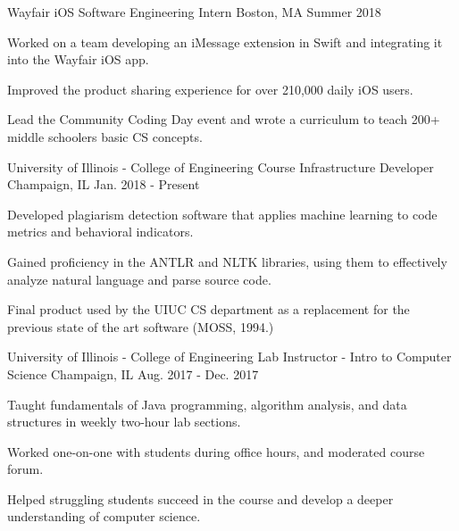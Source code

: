 
\begin{cventries}
\cventry
{Wayfair} %
{iOS Software Engineering Intern} %
{Boston, MA} %
{Summer 2018} %
{
	\begin{cvitems} %
		\item {Worked on a team developing an iMessage extension in Swift and integrating it into the Wayfair iOS app.}
		\item {Improved the product sharing experience for over 210,000 daily iOS users.}
		\item {Lead the Community Coding Day event and wrote a curriculum to teach 200+ middle schoolers basic CS concepts.}
	\end{cvitems}
}
\cventry
{University of Illinois - College of Engineering} %
{Course Infrastructure Developer} %
{Champaign, IL} %
{Jan. 2018 - Present} %
{
    \begin{cvitems} %
        \item {Developed plagiarism detection software that applies machine learning to code metrics and behavioral indicators.}
        \item {Gained proficiency in the ANTLR and NLTK libraries, using them to effectively analyze natural language and parse source code.}
       \item {Final product used by the UIUC CS department as a replacement for the previous state of the art software (MOSS, 1994.)}
    \end{cvitems}
}
\cventry
{University of Illinois - College of Engineering} %
{Lab Instructor - Intro to Computer Science} %
{Champaign, IL} %
{Aug. 2017 - Dec. 2017} %
{
	\begin{cvitems} %
		\item {Taught fundamentals of Java programming, algorithm analysis, and data structures in weekly two-hour lab sections.}
		\item {Worked one-on-one with students during office hours, and moderated course forum.}
		\item {Helped struggling students succeed in the course and develop a deeper understanding of computer science.}
	\end{cvitems}
}
\end{cventries}
